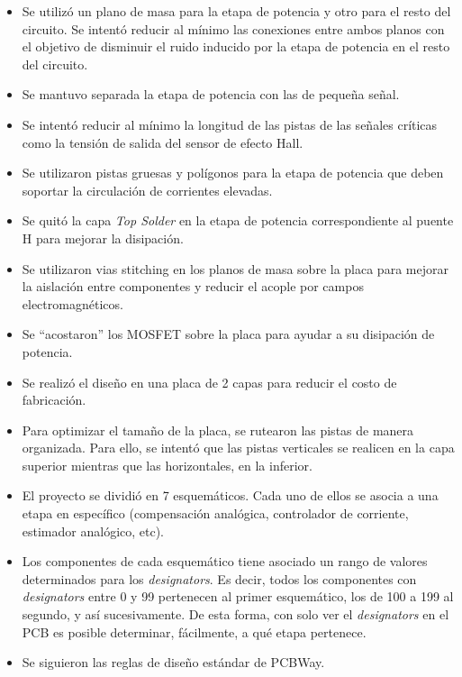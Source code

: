 \begin{itemize}
	\item Se utilizó un plano de masa para la etapa de potencia y otro para el resto del circuito. Se intentó reducir al mínimo las conexiones entre ambos planos con el objetivo de disminuir el ruido inducido por la etapa de potencia en el resto del circuito.
	\item Se mantuvo separada la etapa de potencia con las de pequeña señal.
	\item Se intentó reducir al mínimo la longitud de las pistas de las señales críticas como la tensión de salida del sensor de efecto Hall.
	\item Se utilizaron pistas gruesas y polígonos para la etapa de potencia que deben soportar la circulación de corrientes elevadas.
	\item Se quitó la capa \textsl{Top Solder} en la etapa de potencia correspondiente al puente H para mejorar la disipación.
	\item Se utilizaron vias stitching en los planos de masa sobre la placa para mejorar la aislación entre componentes y reducir el acople por campos electromagnéticos.
	\item Se ``acostaron'' los MOSFET sobre la placa para ayudar a su disipación de potencia.
	\item Se realizó el diseño en una placa de 2 capas para reducir el costo de fabricación.
	\item Para optimizar el tamaño de la placa, se rutearon las pistas de manera organizada. Para ello, se intentó que las pistas verticales se realicen en la capa superior mientras que las horizontales, en la inferior.
	\item El proyecto se dividió en 7 esquemáticos. Cada uno de ellos se asocia a una etapa en específico (compensación analógica, controlador de corriente, estimador analógico, etc). 
	\item  Los componentes de cada esquemático tiene asociado un rango de valores determinados para los \textsl{designators}. Es decir, todos los componentes con \textsl{designators} entre 0 y 99 pertenecen al primer esquemático, los de 100 a 199 al segundo, y así sucesivamente.  De esta forma, con solo ver el \textsl{designators} en el PCB es posible determinar, fácilmente, a qué etapa pertenece.  
	\item Se siguieron las reglas de diseño estándar de PCBWay.
	
\end{itemize}



